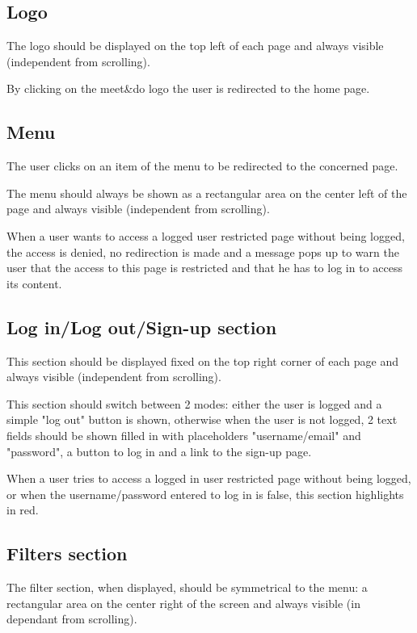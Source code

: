 \documentclass[conference]{IEEEtran}
\begin{document}
\subsection{Logo}

The logo should be displayed on the top left of each page and always visible (independent from scrolling).

By clicking on the meet\&do logo the user is redirected to the home page.

\subsection{Menu}

The user clicks on an item of the menu to be redirected to the concerned page.

The menu should always be shown as a rectangular area on the center left of the page and always visible (independent from scrolling).

When a user wants to access a logged user restricted page without being logged, the access is denied, no redirection is made and a message pops up to warn the user that the access to this page is restricted and that he has to log in to access its content.

\subsection{Log in/Log out/Sign-up section}

This section should be displayed fixed on the top right corner of each page and always visible (independent from scrolling).

This section should switch between 2 modes: either the user is logged and a simple "log out" button is shown, otherwise when the user is not logged, 2 text fields should be shown filled in with placeholders "username/email" and "password", a button to log in and a link to the sign-up page.

When a user tries to access a logged in user restricted page without being logged, or when the username/password entered to log in is false, this section highlights in red.

\subsection{Filters section}

The filter section, when displayed, should be symmetrical to the menu: a rectangular area on the center right of the screen and always visible (in dependant from scrolling).
\end{document}
